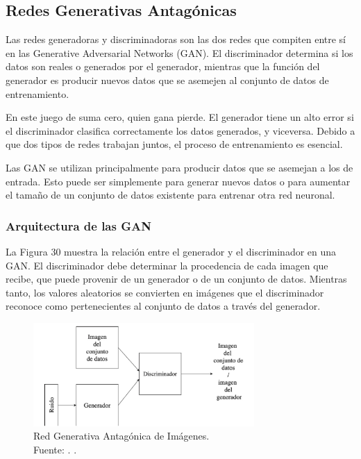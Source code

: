 \subsection{Redes Generativas Antagónicas}

Las redes generadoras y discriminadoras son las dos redes que compiten entre sí en las Generative Adversarial Networks (GAN). El discriminador determina si los datos son reales o generados por el generador, mientras que la función del generador es producir nuevos datos que se asemejen al conjunto de datos de entrenamiento. \parencite{tec_goodfellow2014gan}

En este juego de suma cero, quien gana pierde. El generador tiene un alto error si el discriminador clasifica correctamente los datos generados, y viceversa. Debido a que dos tipos de redes trabajan juntos, el proceso de entrenamiento es esencial. \parencite{tec_goodfellow2014gan}

Las GAN se utilizan principalmente para producir datos que se asemejan a los de entrada. Esto puede ser simplemente para generar nuevos datos o para aumentar el tamaño de un conjunto de datos existente para entrenar otra red neuronal. \parencite{tec_goodfellow2014gan}

\subsubsection{Arquitectura de las GAN}

La Figura 30 muestra la relación entre el generador y el discriminador en una GAN. El discriminador debe determinar la procedencia de cada imagen que recibe, que puede provenir de un generador o de un conjunto de datos. Mientras tanto, los valores aleatorios se convierten en imágenes que el discriminador reconoce como pertenecientes al conjunto de datos a través del generador. \parencite{tec_goodfellow2014gan}

\begin{figure}[!ht]
	\begin{center}
		\includegraphics[width=0.75\textwidth]{2/figures/redgan.jpg}
		\caption[Red Generativa Antagónica de Imágenes]{Red Generativa Antagónica de Imágenes.\\
		Fuente: \cite{tec_goodfellow2014gan}. .}
		\label{2:fig47}
	\end{center}
\end{figure}

